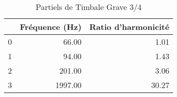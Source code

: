 \begin{table}
\centering
\caption{Partiels de Timbale Grave 3/4}
\label{table:partiels-timbale-grave-3.wav}
\begin{tabular}{lrr}
\toprule
{} &  Fréquence (Hz) &  Ratio d'harmonicité \\
\midrule
0 &           66.00 &                 1.01 \\
1 &           94.00 &                 1.43 \\
2 &          201.00 &                 3.06 \\
3 &         1997.00 &                30.27 \\
\bottomrule
\end{tabular}
\end{table}
